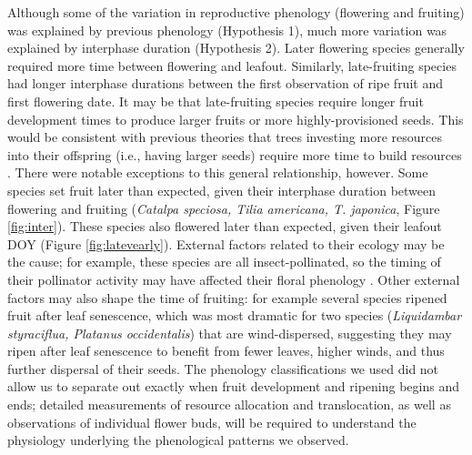 \documentclass{article}
\begin{document}
\par Although some of the variation in reproductive phenology (flowering and fruiting) was explained by previous phenology (Hypothesis 1), much more variation was explained by interphase duration (Hypothesis 2). Later flowering species generally required more time between flowering and leafout. Similarly, late-fruiting species had longer interphase durations between the first observation of ripe fruit and first flowering date. It may be that late-fruiting species require longer fruit development times to produce larger fruits or more highly-provisioned seeds. This would be consistent with previous theories that trees investing more resources into their offspring (i.e., having larger seeds) require more time to build resources \citep{bolmgren2008,sun2011}. There were notable exceptions to this general relationship, however. Some species set fruit later than expected, given their interphase duration between flowering and fruiting (\textit{Catalpa speciosa, Tilia americana, T. japonica}, Figure \ref{fig:inter}). These species also flowered later than expected, given their leafout DOY (Figure \ref{fig:latevearly}). External factors related to their ecology may be the cause; for example, these species are all insect-pollinated, so the timing of their pollinator activity may have affected their floral phenology \citep{elzinga2007}. Other external factors may also shape the time of fruiting: for example several species ripened fruit after leaf senescence, which was most dramatic for two species (\emph{Liquidambar styraciflua, Platanus occidentalis}) that are wind-dispersed, suggesting they may ripen after leaf senescence to benefit from fewer leaves, higher winds, and thus further dispersal of their seeds. The phenology classifications we used did not allow us to separate out exactly when fruit development and ripening begins and ends; detailed measurements of resource allocation and translocation, as well as  observations of individual flower buds, will be required to understand the physiology underlying the phenological patterns we observed. 
\end{document}
